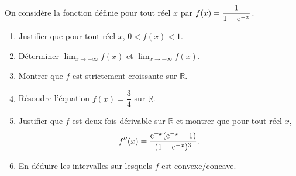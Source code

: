 \documentclass[11pt,fleqn, openany]{book} %
\begin{document}
\begin{exercise}On considère la fonction définie pour tout réel $x$ par $f(x)=\dfrac{1}{1+\mathrm{e}^{-x}}$.
\begin{enumerate}
\item Justifier que pour tout réel $x$, $0<f(x)<1$.
\item Déterminer $\displaystyle \lim _{x \to +\infty}f(x)$ et $\displaystyle \lim _{x \to -\infty}f(x)$.
\item Montrer que $f$ est strictement croissante sur $\mathbb{R}$.
\item Résoudre l'équation $f(x)=\dfrac{3}{4}$ sur $\mathbb{R}$.
\item Justifier que $f$ est deux fois dérivable sur $\mathbb{R}$ et montrer que pour tout réel $x$,
\[f''(x) = \dfrac{\mathrm{e}^{-x}(\mathrm{e}^{-x}-1)}{(1+\mathrm{e}^{-x})^3}.\]
\item En déduire les intervalles sur lesquels $f$ est convexe/concave.
\end{enumerate}\end{exercise}
\end{document}
